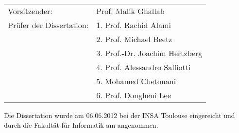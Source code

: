   \vspace{1cm}

  \begin{tabular}{ll}
    Vorsitzender:              & Prof. Malik Ghallab \\[10mm]

    Pr\"ufer der Dissertation: & 1. Prof. Rachid Alami\\ %
                               & 2. Prof. Michael Beetz\\ %
                               & 3. Prof.-Dr. Joachim Hertzberg\\ %
                               & 4. Prof. Alessandro Saffiotti\\ %
                               & 5. Mohamed Chetouani\\ %
                               & 6. Prof. Dongheui Lee\\ %
  \end{tabular}

  \vspace{1.5cm}

\normalsize
{\flushleft

Die Dissertation wurde am 06.06.2012 bei der INSA Toulouse eingereicht und
durch die Fakult{\"a}t f{\"u}r Informatik am \hspace{2cm} angenommen.

}



